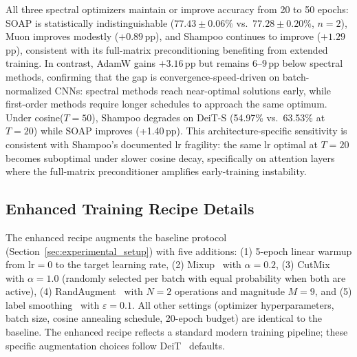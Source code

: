 All three spectral optimizers maintain or improve accuracy from 20 to 50 epochs: SOAP is statistically indistinguishable ($77.43{\pm}0.06\%$ vs.\ $77.28{\pm}0.20\%$, $n{=}2$), Muon improves modestly ($+0.89$\,pp), and Shampoo continues to improve ($+1.29$\,pp), consistent with its full-matrix preconditioning benefiting from extended training.
In contrast, AdamW gains $+3.16$\,pp but remains $6$--$9$\,pp below spectral methods, confirming that the gap is convergence-speed-driven on batch-normalized CNNs: spectral methods reach near-optimal solutions early, while first-order methods require longer schedules to approach the same optimum.
Under cosine($T{=}50$), Shampoo degrades on DeiT-S (54.97\% vs.\ 63.53\% at $T{=}20$) while SOAP improves (+1.40\,pp). This architecture-specific sensitivity is consistent with Shampoo's documented lr fragility: the same lr optimal at $T{=}20$ becomes suboptimal under slower cosine decay, specifically on attention layers where the full-matrix preconditioner amplifies early-training instability.

\subsection{Enhanced Training Recipe Details}
\label{sec:enhanced_recipe_details}

The enhanced recipe augments the baseline protocol (Section~\ref{sec:experimental_setup}) with five additions: (1) 5-epoch linear warmup from $\text{lr}=0$ to the target learning rate, (2) Mixup~\cite{zhang2018mixup} with $\alpha=0.2$, (3) CutMix~\cite{yun2019cutmix} with $\alpha=1.0$ (randomly selected per batch with equal probability when both are active), (4) RandAugment~\cite{cubuk2020randaugment} with $N=2$ operations and magnitude $M=9$, and (5) label smoothing~\cite{szegedy2016rethinking} with $\varepsilon=0.1$.
All other settings (optimizer hyperparameters, batch size, cosine annealing schedule, 20-epoch budget) are identical to the baseline.
The enhanced recipe reflects a standard modern training pipeline; these specific augmentation choices follow DeiT~\cite{touvron2021training} defaults.

